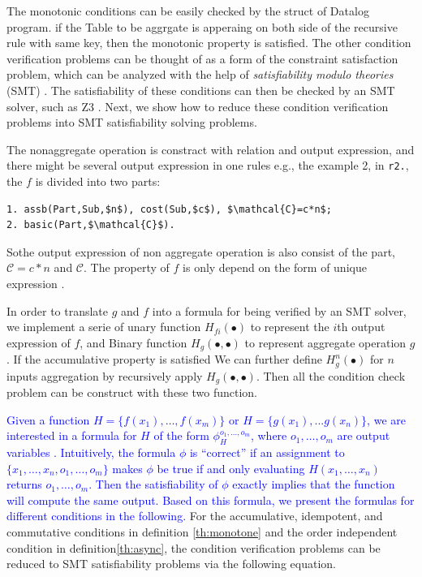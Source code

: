 The monotonic conditions can be easily checked by the struct of Datalog program. if the Table to be aggrgate is apperaing on both side of the recursive rule with same key, then the monotonic property is satisfied. The other condition verification problems can be thought of as a form of the constraint satisfaction problem, which can be analyzed with the help of \emph{satisfiability modulo theories} (SMT) \cite{53e486195688442995f82bfe28c55731}. The satisfiability of these conditions can then be checked by an SMT solver, such as Z3 \cite{DeMoura:2008:ZES:1792734.1792766}. Next, we show how to reduce these condition verification problems into SMT satisfiability solving problems.

The nonaggregate operation is constract with relation and output expression, and there might be several output expression in one rules e.g., the example 2, in \texttt{r2.}, the $f$ is divided into two parts:
\begin{lstlisting}
1. assb(Part,Sub,$n$), cost(Sub,$c$), $\mathcal{C}=c*n$;
2. basic(Part,$\mathcal{C}$).
\end{lstlisting}
Sothe output expression of non aggregate operation is also consist of the part, $\mathcal{C}=c*n$ and  $\mathcal{C}$. The property of $f$ is only depend on the form of unique expression .


In order to translate $g$ and $f$ into a formula for being verified by an SMT solver, we implement a serie of unary function $H_{fi}(\bullet)$  to represent the $i$th output expression of $f$, and Binary function $H_g(\bullet,\bullet)$ to represent aggregate operation $g$. If the accumulative property is satisfied
We can further define $H^n_g(\bullet)$ for $n$ inputs aggregation by recursively apply $H_g(\bullet,\bullet)$.
Then all the condition check problem can be construct with these two function.

\textcolor{blue}{ Given a function $H=\{f(x_1),\ldots,f(x_m)\}$ or $H=\{g(x_1),...g(x_n)\}$, we are interested in a formula for $H$ of the form $\phi_H^{o_1,\ldots,o_m}$, where $o_1,\ldots,o_m$ are output variables \cite{Liu:2014:ADP:2670979.2670980}. Intuitively, the formula $\phi$ is ``correct'' if an assignment to $\{x_1,\ldots,x_n,o_1,\ldots,o_m\}$ makes $\phi$ be true if and only evaluating $H(x_1,\ldots,x_n)$ returns $o_1,\ldots,o_m$. Then the satisfiability of $\phi$ exactly implies that the function will compute the same output. Based on this formula, we present the formulas for different conditions in the following.
}
For the accumulative, idempotent, and commutative conditions in definition \ref{th:monotone} and the order independent condition in definition\ref{th:async}, the condition verification problems can be reduced to SMT satisfiability problems via the following equation.

